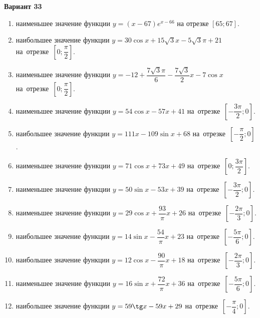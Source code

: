 \documentclass[a4paper,10pt]{article}
\begin{document}
\begin{center}\Large\textbf{Вариант 33}\end{center}

\begin{enumerate}
\item {} наименьшее значение функции $y = \left(x-67\right)e^{x-66}$ на отрезке $\left[65;67\right]$.

\item {} наибольшее значение функции $y = 30\cos x+15\sqrt{3}x-5\sqrt{3}\pi +21$ на~отрезке~$\left[0;\dfrac{\pi }{2}\right]$.

\item {} наименьшее значение функции $y = -12+\dfrac{7\sqrt{3} \pi}{6}-\dfrac{7\sqrt{3}}{2}x-7\cos x$ на~отрезке~$\left[0;\dfrac{\pi }{2}\right]$.

\item {} наименьшее значение функции $y = 54\cos x-57x+41$ на~отрезке~$\left[-\dfrac{3\pi }{2};0\right]$.

\item {} наибольшее значение функции $y = 111x-109\sin x+68$ на~отрезке~$\left[-\dfrac{\pi }{2};0\right]$.

\item {} наименьшее значение функции $y = 71\cos x+73x+49$ на~отрезке~$\left[0;\dfrac{3\pi }{2}\right]$.

\item {} наименьшее значение функции $y = 50\sin x-53x+39$ на~отрезке~$\left[-\dfrac{3\pi }{2};0\right]$.

\item {} наименьшее значение функции $y = 29\cos x+\dfrac{93}{\pi }x +26$ на~отрезке~$\left[-\dfrac{2\pi }{3};0\right]$.

\item {} наибольшее значение функции $y = 14\sin x-\dfrac{54}{\pi }x+23$ на~отрезке~$\left[-\dfrac{5\pi }{6};0\right]$.

\item {} наибольшее значение функции $y = 12\cos x-\dfrac{90}{\pi }x+18$ на~отрезке~$\left[-\dfrac{2\pi }{3};0\right]$.

\item {} наименьшее значение функции $y = 16\sin x+\dfrac{72}{\pi }x+36$ на~отрезке~$\left[-\dfrac{5\pi }{6};0\right]$.

\item {} наибольшее значение функции $y = 59\tg x-59x+29$ на~отрезке~$\left[-\dfrac{\pi }{4};0\right]$.


\end{enumerate}
\end{document}

